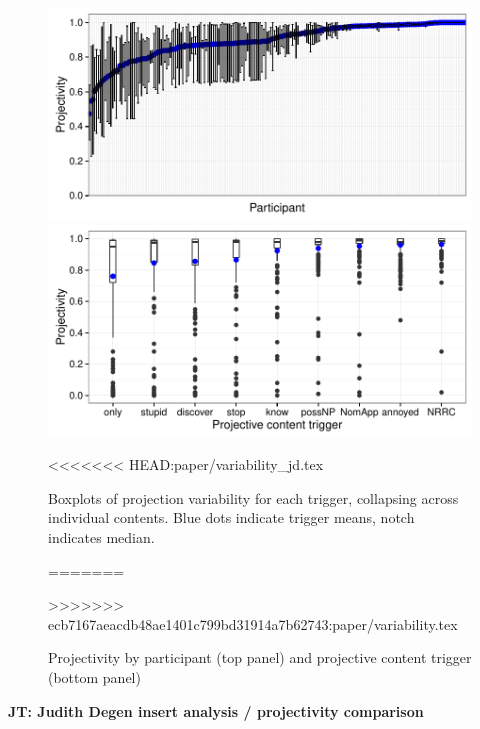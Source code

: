 \documentclass[11pt,fleqn]{article}
\newcommand{\6}{\mbox{$[\hspace*{-.6mm}[$}}
\newcommand{\9}{\mbox{$]\hspace*{-.6mm}]$}}
\newcommand{\jt}[1]{\textbf{\color{blue}JT: #1}}
\begin{document}
\begin{figure}[!h]

\begin{center}
\includegraphics[width=12cm]{../results/exp1a/graphs/projection-subjectmeans}

\includegraphics[width=12cm]{../results/exp1a/graphs/boxplot-projection}

\end{center}
<<<<<<< HEAD:paper/variability_jd.tex

\caption{Boxplots of projection variability for each trigger, collapsing across individual contents. Blue dots indicate trigger means, notch indicates median.}\label{f-proj-1a}
=======
\caption{Projectivity by participant (top panel) and projective content trigger (bottom panel)}
\label{f-proj-1a}
>>>>>>> ecb7167aeacdb48ae1401c799bd31914a7b62743:paper/variability.tex
\end{figure}

\jt{Judith Degen insert analysis / projectivity comparison}
\end{document}
